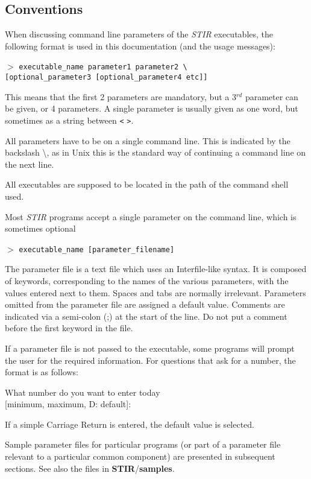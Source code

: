\documentclass{article}
\newcommand{\tab}{\hspace{5mm}}
\newcommand{\cmdline}[1]{\par \noindent $>$ \texttt{#1}\par}
\begin{document}
\subsection{
Conventions}
\label{sec:conventions}
When discussing command line parameters of the \textit{STIR} executables, 
the following format is used in this documentation (and the usage messages):
\cmdline{executable\_name parameter1 parameter2 {\textbackslash}\\
{[}optional\_parameter3 [optional\_parameter4 etc]]}


This means that the first 2 parameters are mandatory, but a 3$^{rd}$ 
parameter can be given, or 4 parameters. A single parameter is 
usually given as one word, but sometimes as a string between 
\texttt{<} \texttt{>}. 


All parameters have to be on a single command line. This is indicated 
by the backslash {\textbackslash}, as in Unix this is the standard way 
of continuing a command line on the next line.


All executables are supposed to be located in the path of the 
command shell used.


Most \textit{STIR} programs accept a single parameter on the command 
line, which is sometimes optional

\cmdline{executable\_name [parameter\_filename]}


The parameter file is a text file which uses an Interfile-like 
syntax. It is composed of keywords, corresponding to the names 
of the various parameters, with the values entered next to them. 
Spaces and tabs are normally irrelevant. Parameters omitted from 
the parameter file are assigned a default value. 
Comments are indicated via a semi-colon (;) at the start of the line. Do
not put a comment before the first keyword in the file.

If a parameter file is not passed to the executable, some
programs will prompt the user 
for the required information. For questions that 
ask for a number, the format is as follows:


\tab What number do you want to enter today \\
\tab [minimum, maximum, D: default]:


If a simple Carriage Return is entered, the default value is 
selected.


Sample parameter files for particular programs (or part of a 
parameter file relevant to a particular common component) are 
presented in subsequent sections. See also the files in \textbf{STIR}/\textbf{samples}.
\end{document}

